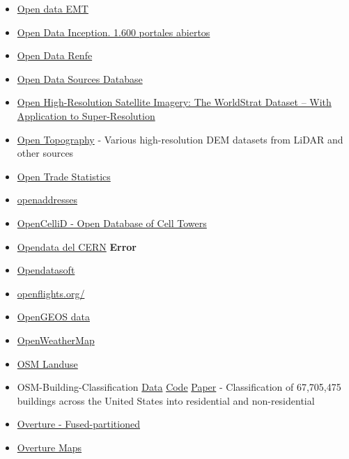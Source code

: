 \documentclass[
]{article}
\begin{document}
\begin{itemize}
{  Data Barometer}
\item
  \href{http://opendata.emtmadrid.es/}{Open data EMT}
\item
  \href{http://wwwhatsnew.com/2016/03/19/open-data-inception-recopilacion-de-1600-portales-de-datos-abiertos/?utm_content=buffer4e4d4&utm_medium=social&utm_source=linkedin.com&utm_campaign=buffer}{Open
  Data Inception. 1.600 portales abiertos}
\item
  \href{http://data.renfe.com/}{Open Data Renfe}
\item
  \href{https://anthonyhuntley.com/data-science-databases/\#DataSourceDatabase}{Open
  Data Sources Database}
\item
  \href{https://arxiv.org/abs/2207.06418}{Open High-Resolution Satellite
  Imagery: The WorldStrat Dataset -- With Application to
  Super-Resolution}
\item
  \href{https://opentopography.org/}{Open Topography} - Various
  high-resolution DEM datasets from LiDAR and other sources
\item
  \href{https://tradestatistics.io/}{Open Trade Statistics}
\item
  \href{https://openaddresses.io/}{openaddresses}
\item
  \href{https://www.opencellid.org/downloads.php}{OpenCelliD - Open
  Database of Cell Towers}
\item
  \href{http://opendata.cern.ch/}{Opendata del CERN} \textbf{Error}
\item
  \href{https://documentation-resources.opendatasoft.com/explore/?sort=modified}{Opendatasoft}
\item
  \href{https://openflights.org/}{openflights.org/}
\item
  \href{https://github.com/opengeos/data}{OpenGEOS data}
\item
  \href{https://openweathermap.org/api}{OpenWeatherMap}
\item
  \href{https://osmlanduse.org/}{OSM Landuse}
\item
  OSM-Building-Classification \href{https://osf.io/utgae/}{Data}
  \href{https://github.com/gmuggs/OSM-Building-Classification}{Code}
  \href{https://www.nature.com/articles/s41597-024-04046-w}{Paper} -
  Classification of 67,705,475 buildings across the United States into
  residential and non-residential
\item
  \href{https://beta.source.coop/repositories/fused/overture/description/}{Overture
  - Fused-partitioned}
\item
  \href{https://github.com/OvertureMaps/data}{Overture Maps}

\end{itemize}
\end{document}
